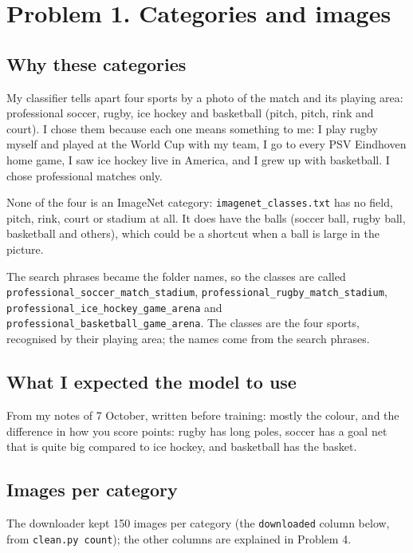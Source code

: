 \documentclass[11pt]{article}
\begin{document}
\makeheader

\section*{Problem 1. Categories and images}

\subsection*{Why these categories}
My classifier tells apart four sports by a photo of the match and its playing
area: professional soccer, rugby, ice hockey and basketball (pitch, pitch, rink
and court). I chose them because each one means something to me: I play rugby
myself and played at the World Cup with my team, I go to every PSV Eindhoven home
game, I saw ice hockey live in America, and I grew up with basketball. I chose
professional matches only.

None of the four is an ImageNet category: \texttt{imagenet\_classes.txt} has no
field, pitch, rink, court or stadium at all. It does have the balls (soccer ball,
rugby ball, basketball and others), which could be a shortcut when a ball is
large in the picture.

The search phrases became the folder names, so the classes are called
\texttt{professional\_soccer\_match\_stadium},
\texttt{professional\_rugby\_match\_stadium},
\texttt{professional\_ice\_hockey\_game\_arena} and
\texttt{professional\_basketball\_game\_arena}. The classes are the four sports,
recognised by their playing area; the names come from the search phrases.

\subsection*{What I expected the model to use}
From my notes of 7 October, written before training: mostly the colour, and the
difference in how you score points: rugby has long poles, soccer has a goal net
that is quite big compared to ice hockey, and basketball has the basket.

\subsection*{Images per category}
The downloader kept 150 images per category (the \texttt{downloaded} column below,
from \texttt{clean.py count}); the other columns are explained in Problem 4.
\end{document}
